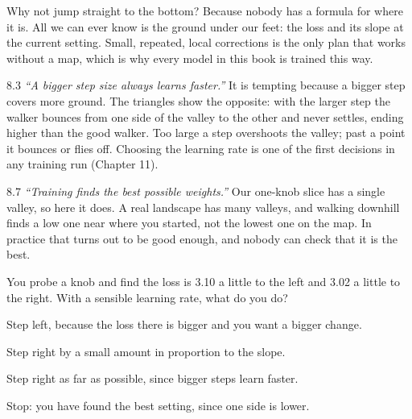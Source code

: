 \Why Why not jump straight to the bottom? Because nobody has a formula for where it is. All we can ever know
is the ground under our feet: the loss and its slope at the current setting. Small, repeated, local
corrections is the only plan that works without a map, which is why every model in this book is trained this
way.

\begin{wrongidea}{8.3}
\emph{``A bigger step size always learns faster.''} It is tempting because a bigger step covers more ground. The
triangles show the opposite: with the larger step the walker bounces from one side of the valley to the other and never settles, ending higher than the good walker. Too large a step overshoots the valley; past a point it bounces or flies off. Choosing the learning rate is
one of the first decisions in any training run (Chapter 11).
\end{wrongidea}

\begin{wrongidea}{8.7}
\emph{``Training finds the best possible weights.''} Our one-knob slice has a single valley, so here it
does. A real landscape has many valleys, and walking downhill finds a low one near where you started, not the
lowest one on the map. In practice that turns out to be good enough, and nobody can check that it is the best.
\end{wrongidea}

\begin{checkq}
You probe a knob and find the loss is 3.10 a little to the left and 3.02 a little to the right. With a
sensible learning rate, what do you do?
\begin{options}
\item Step left, because the loss there is bigger and you want a bigger change.
\item Step right by a small amount in proportion to the slope.
\item Step right as far as possible, since bigger steps learn faster.
\item Stop: you have found the best setting, since one side is lower.
\end{options}
\end{checkq}


